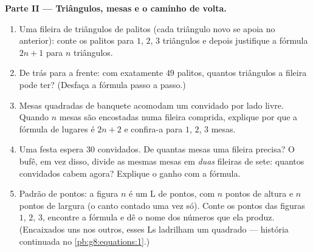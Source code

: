 \begin{problem}
\medskip
\noindent\textbf{Parte II --- Triângulos, mesas e o caminho de
volta.}
\begin{enumerate}[resume]
  \item Uma fileira de triângulos de palitos (cada triângulo novo se
        apoia no anterior): conte os palitos para $1$, $2$, $3$
        triângulos e depois justifique a fórmula $2n + 1$ para $n$
        triângulos.
  \item De trás para a frente: com exatamente $49$ palitos, quantos
        triângulos a fileira pode ter? (Desfaça a fórmula passo a
        passo.)
  \item Mesas quadradas de banquete acomodam um convidado por lado
        livre. Quando $n$ mesas são encostadas numa fileira comprida,
        explique por que a fórmula de lugares é $2n + 2$ e confira-a
        para $1$, $2$, $3$ mesas.
  \item Uma festa espera $30$ convidados. De quantas mesas uma fileira
        precisa? O bufê, em vez disso, divide as mesmas mesas em
        \emph{duas} fileiras de sete: quantos convidados cabem agora?
        Explique o ganho com a fórmula.
  \item Padrão de pontos: a figura $n$ é um L de pontos, com $n$ pontos
        de altura e $n$ pontos de largura (o canto contado uma vez só).
        Conte os pontos das figuras $1$, $2$, $3$, encontre a fórmula e
        dê o nome dos números que ela produz. (Encaixados uns nos
        outros, esses Ls ladrilham um quadrado --- história continuada
        no \cref{pb:g8:equations:1}.)
\end{enumerate}


\end{problem}
